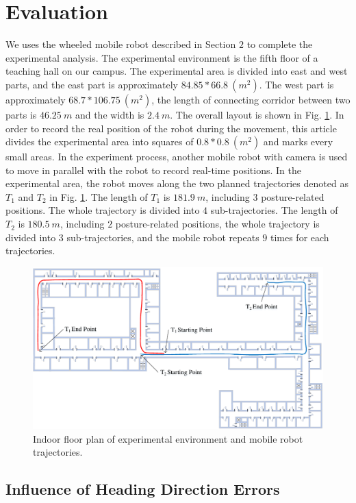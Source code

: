 \documentclass{llncs}
\begin{document}
\section{Evaluation}

We uses the wheeled mobile robot described in Section $2$ to complete the experimental analysis. The experimental environment is the fifth floor of a teaching hall on our campus. The experimental area is divided into east and west parts, and the east part is approximately $84.85 * 66.8\ (m^2)$. The west part is approximately $68.7 * 106.75\ (m^2)$, the length of connecting corridor between two parts is $46.25\ m$ and the width is $2.4\ m$. The overall layout is shown in Fig. \ref{fig-environment}. In order to record the real position of the robot during the movement, this article divides the experimental area into squares of $0.8 * 0.8\ (m^2)$ and marks every small areas. In the experiment process, another mobile robot with camera is used to move in parallel with the robot to record real-time positions. In the experimental area, the robot moves along the two planned trajectories denoted as $T_1$ and $T_2$ in Fig. \ref{fig-environment}. The length of $T_1$ is $181.9\ m$, including $3$ posture-related positions. The whole trajectory is divided into $4$ sub-trajectories. The length of $T_2$ is $180.5\ m$, including $2$ posture-related positions, the whole trajectory is divided into $3$ sub-trajectories, and the mobile robot repeats $9$ times for each trajectories.

\begin{figure}[!htbp]
	\centering
	\includegraphics[width=4.976in]{RobotMatch-Environment}
	\caption{Indoor floor plan of experimental environment and mobile robot trajectories.}
	\label{fig-environment}
\end{figure}

\subsection{Influence of Heading Direction Errors}
\end{document}
